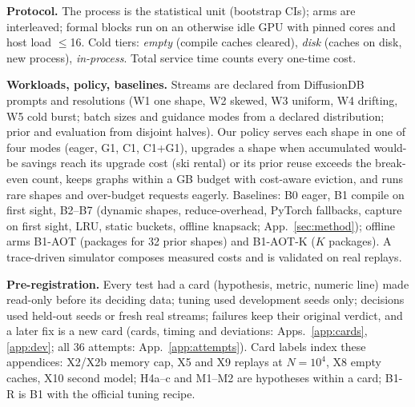 \documentclass[conference]{IEEEtran}
\begin{document}
\textbf{Protocol.} The process is the statistical unit (bootstrap CIs); arms are interleaved; formal blocks run on an otherwise idle GPU with pinned cores and host load $\le$16. Cold tiers: \emph{empty} (compile caches cleared), \emph{disk} (caches on disk, new process), \emph{in-process}. Total service time counts every one-time cost.

\textbf{Workloads, policy, baselines.} Streams are declared from DiffusionDB~\cite{diffusiondb} prompts and resolutions (W1 one shape, W2 skewed, W3 uniform, W4 drifting, W5 cold burst; batch sizes and guidance modes from a declared distribution; prior and evaluation from disjoint halves). Our policy serves each shape in one of four modes (eager, G1, C1, C1+G1), upgrades a shape when accumulated would-be savings reach its upgrade cost (ski rental) or its prior reuse exceeds the break-even count, keeps graphs within a \NMemGraphBudgetGB{} GB budget with cost-aware eviction, and runs rare shapes and over-budget requests eagerly. Baselines: B0 eager, B1 compile on first sight, B2--B7 (dynamic shapes, reduce-overhead, PyTorch fallbacks, capture on first sight, LRU, static buckets, offline knapsack; App.~\ref{sec:method}); offline arms B1-AOT (packages for 32 prior shapes) and B1-AOT-K ($K$ packages). A trace-driven simulator composes measured costs and is validated on real replays.

\textbf{Pre-registration.} Every test had a card (hypothesis, metric, numeric line) made read-only before its deciding data; tuning used development seeds only; decisions used held-out seeds or fresh real streams; failures keep their original verdict, and a later fix is a new card (cards, timing and deviations: Apps.~\ref{app:cards}, \ref{app:dev}; all 36 attempts: App.~\ref{app:attempts}). Card labels index these appendices: X2/X2b memory cap, X5 and X9 replays at $N{=}10^4$, X8 empty caches, X10 second model; H4a--c and M1--M2 are hypotheses within a card; B1-R is B1 with the official tuning recipe.
\end{document}
